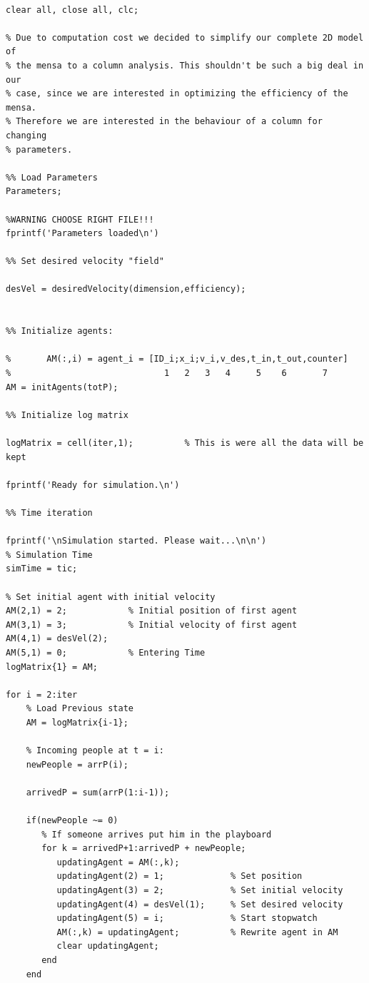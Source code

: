 \documentclass[11pt]{article}
\begin{document}
\begin{lstlisting}[frame=lines]
%% 1D Mensa Simulation

clear all, close all, clc;

% Due to computation cost we decided to simplify our complete 2D model of
% the mensa to a column analysis. This shouldn't be such a big deal in our
% case, since we are interested in optimizing the efficiency of the mensa.
% Therefore we are interested in the behaviour of a column for changing
% parameters.

%% Load Parameters
Parameters;

%WARNING CHOOSE RIGHT FILE!!!
fprintf('Parameters loaded\n')

%% Set desired velocity "field"

desVel = desiredVelocity(dimension,efficiency);
                            
           
%% Initialize agents:

%       AM(:,i) = agent_i = [ID_i;x_i;v_i,v_des,t_in,t_out,counter]
%                              1   2   3   4     5    6       7  
AM = initAgents(totP);

%% Initialize log matrix

logMatrix = cell(iter,1);          % This is were all the data will be kept

fprintf('Ready for simulation.\n')
                            
%% Time iteration

fprintf('\nSimulation started. Please wait...\n\n')
% Simulation Time
simTime = tic;

% Set initial agent with initial velocity
AM(2,1) = 2;            % Initial position of first agent
AM(3,1) = 3;            % Initial velocity of first agent
AM(4,1) = desVel(2); 
AM(5,1) = 0;            % Entering Time
logMatrix{1} = AM;

for i = 2:iter
    % Load Previous state
    AM = logMatrix{i-1};
    
    % Incoming people at t = i:
    newPeople = arrP(i);
    
    arrivedP = sum(arrP(1:i-1));
    
    if(newPeople ~= 0)
       % If someone arrives put him in the playboard
       for k = arrivedP+1:arrivedP + newPeople;
          updatingAgent = AM(:,k);
          updatingAgent(2) = 1;             % Set position
          updatingAgent(3) = 2;             % Set initial velocity
          updatingAgent(4) = desVel(1);     % Set desired velocity
          updatingAgent(5) = i;             % Start stopwatch
          AM(:,k) = updatingAgent;          % Rewrite agent in AM
          clear updatingAgent;
       end
    end
    

\end{lstlisting}
\end{document}
